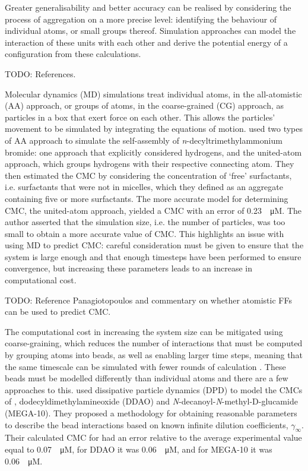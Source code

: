 Greater generalisability and better accuracy can be realised by considering the
process of aggregation on a more precise level: identifying the behaviour of
individual atoms, or small groups thereof. Simulation approaches can model the
interaction of these units with each other and derive the potential energy of a
configuration from these calculations.

TODO: References.

Molecular dynamics (MD) simulations treat individual atoms, in the all-atomistic
(AA) approach, or groups of atoms, in the coarse-grained (CG) approach, as
particles in a box that exert force on each other. This allows the particles'
movement to be simulated by integrating the equations of motion.
\citet{jorgeMolecularDynamicsSimulation2008} used two types of AA approach to
simulate the self-assembly of \textit{n}-decyltrimethylammonium bromide: one
approach that explicitly considered hydrogens, and the united-atom approach, which
groups hydrogens with their respective connecting atom. They then estimated the
CMC by considering the concentration of `free' surfactants, i.e. surfactants
that were not in micelles, which they defined as an aggregate containing five or
more surfactants. The more accurate model for determining CMC, the united-atom
approach, yielded a CMC with an error of \SI{0.23}{\log \micro M}. The author
asserted that the simulation size, i.e. the number of particles, was too small
to obtain a more accurate value of CMC. This highlights an issue with using MD
to predict CMC: careful consideration must be given to ensure that the system is
large enough and that enough timesteps have been performed to ensure
convergence, but increasing these parameters leads to an increase in
computational cost.

TODO: Reference Panagiotopoulos and commentary on whether atomistic FFs can be used
to predict CMC.

The computational cost in increasing the system size can be mitigated using
coarse-graining, which reduces the number of interactions that must be computed
by grouping atoms into beads, as well as enabling larger time steps, meaning
that the same timescale can be simulated with fewer rounds of calculation
\cite{fitzgeraldMultiscaleModelingNanomaterials2015}. These beads must be
modelled differently than individual atoms and there are a few approaches to
this. \citet{vishnyakovPredictionCriticalMicelle2013} used dissipative particle
dynamics (DPD) to model the CMCs of , dodecyldimethylamineoxide (DDAO)
and \textit{N}-decanoyl-\textit{N}-methyl-\textsc{D}-glucamide (MEGA-10). They
proposed a methodology for obtaining reasonable parameters to describe the bead
interactions based on known infinite dilution coefficients, $\gamma_\infty$.
Their calculated CMC for  had an error relative to the average
experimental value equal to \SI{0.07}{\log \micro M}, for DDAO it was
\SI{0.06}{\log \micro M}, and for MEGA-10 it was \SI{0.06}{\log \micro M}.

